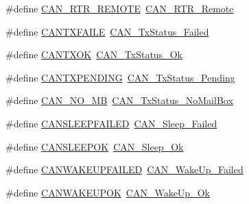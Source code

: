 \begin{DoxyCompactItemize}
\item 
\#define \mbox{\hyperlink{group___c_a_n___legacy_gab15c649e3e497c6d1145bb98ff7f3f04}{C\+A\+N\+\_\+\+R\+T\+R\+\_\+\+R\+E\+M\+O\+TE}}~\mbox{\hyperlink{group___c_a_n__remote__transmission__request_ga42e95ddfb02d88c82de84058fb0fb349}{C\+A\+N\+\_\+\+R\+T\+R\+\_\+\+Remote}}
\item 
\#define \mbox{\hyperlink{group___c_a_n___legacy_gae315f7ee14af20ca8454be9e507873cd}{C\+A\+N\+T\+X\+F\+A\+I\+LE}}~\mbox{\hyperlink{group___c_a_n__transmit__constants_ga8d193002e76c04ec8caff6b110cd5983}{C\+A\+N\+\_\+\+Tx\+Status\+\_\+\+Failed}}
\item 
\#define \mbox{\hyperlink{group___c_a_n___legacy_ga288ba42cf1de7572f2fe1378268c9452}{C\+A\+N\+T\+X\+OK}}~\mbox{\hyperlink{group___c_a_n__transmit__constants_ga0b401c61922b1449de9b486dcf475c97}{C\+A\+N\+\_\+\+Tx\+Status\+\_\+\+Ok}}
\item 
\#define \mbox{\hyperlink{group___c_a_n___legacy_ga76f43f4c54505b1f87b39b056ca38897}{C\+A\+N\+T\+X\+P\+E\+N\+D\+I\+NG}}~\mbox{\hyperlink{group___c_a_n__transmit__constants_ga9678a3a51379422868083608c7394409}{C\+A\+N\+\_\+\+Tx\+Status\+\_\+\+Pending}}
\item 
\#define \mbox{\hyperlink{group___c_a_n___legacy_ga418f1fd7ca2e852b263fd07874fde0c6}{C\+A\+N\+\_\+\+N\+O\+\_\+\+MB}}~\mbox{\hyperlink{group___c_a_n__transmit__constants_ga2620e99debd51011d3569121f2e44690}{C\+A\+N\+\_\+\+Tx\+Status\+\_\+\+No\+Mail\+Box}}
\item 
\#define \mbox{\hyperlink{group___c_a_n___legacy_ga4d5e8e0c57febb024b30e5f24866a117}{C\+A\+N\+S\+L\+E\+E\+P\+F\+A\+I\+L\+ED}}~\mbox{\hyperlink{group___c_a_n__sleep__constants_ga169500ab7169c4e9c7e9e4ea34b3e070}{C\+A\+N\+\_\+\+Sleep\+\_\+\+Failed}}
\item 
\#define \mbox{\hyperlink{group___c_a_n___legacy_ga2f8d34f8f60a6c84d8e436d4d37708ab}{C\+A\+N\+S\+L\+E\+E\+P\+OK}}~\mbox{\hyperlink{group___c_a_n__sleep__constants_gaf5c4e9d32d4faff9d0bf61e153ed7998}{C\+A\+N\+\_\+\+Sleep\+\_\+\+Ok}}
\item 
\#define \mbox{\hyperlink{group___c_a_n___legacy_ga0de3b0e2c544d9fa772b646e331e51b1}{C\+A\+N\+W\+A\+K\+E\+U\+P\+F\+A\+I\+L\+ED}}~\mbox{\hyperlink{group___c_a_n__wake__up__constants_ga837fd7ad47fee78e43a186544e2b390b}{C\+A\+N\+\_\+\+Wake\+Up\+\_\+\+Failed}}
\item 
\#define \mbox{\hyperlink{group___c_a_n___legacy_gafed6ab4dbb00c9d63f6a7cdf323f33ef}{C\+A\+N\+W\+A\+K\+E\+U\+P\+OK}}~\mbox{\hyperlink{group___c_a_n__wake__up__constants_ga152e4935cf85bdfb803eb36b656cd690}{C\+A\+N\+\_\+\+Wake\+Up\+\_\+\+Ok}}
\end{DoxyCompactItemize}


